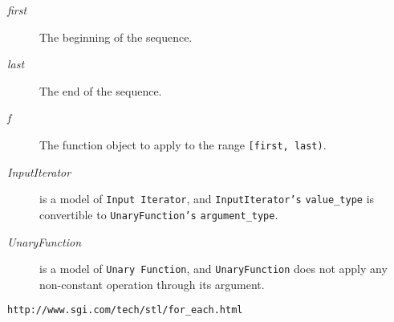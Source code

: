 \begin{Desc}
\item[Parameters:]
\begin{description}
\item[{\em first}]The beginning of the sequence. \item[{\em last}]The end of the sequence. \item[{\em f}]The function object to apply to the range {\tt [first, last)}.\end{description}
\end{Desc}
\begin{Desc}
\item[Template Parameters:]
\begin{description}
\item[{\em InputIterator}]is a model of {\tt Input Iterator}, and {\tt InputIterator's} {\tt value\_\-type} is convertible to {\tt UnaryFunction's} {\tt argument\_\-type}. \item[{\em UnaryFunction}]is a model of {\tt Unary Function}, and {\tt UnaryFunction} does not apply any non-constant operation through its argument.\end{description}
\end{Desc}
\begin{Desc}
\item[See also:]{\tt http://www.sgi.com/tech/stl/for\_\-each.html} \end{Desc}
